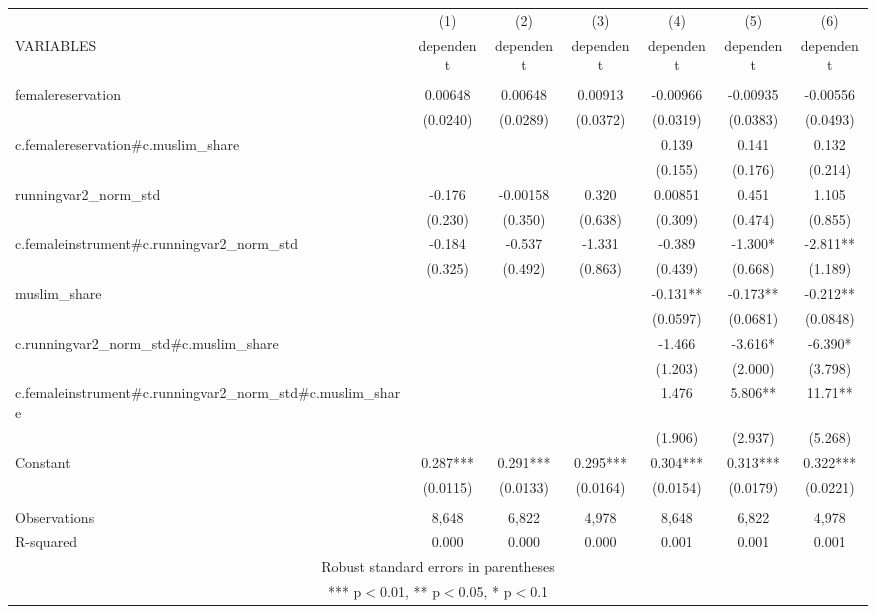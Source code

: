 \documentclass[]{article}
\begin{document}
\begin{tabular}{lcccccc} \hline
 & (1) & (2) & (3) & (4) & (5) & (6) \\
VARIABLES & dependent & dependent & dependent & dependent & dependent & dependent \\ \hline
 &  &  &  &  &  &  \\
femalereservation & 0.00648 & 0.00648 & 0.00913 & -0.00966 & -0.00935 & -0.00556 \\
 & (0.0240) & (0.0289) & (0.0372) & (0.0319) & (0.0383) & (0.0493) \\
c.femalereservation\#c.muslim\_share &  &  &  & 0.139 & 0.141 & 0.132 \\
 &  &  &  & (0.155) & (0.176) & (0.214) \\
runningvar2\_norm\_std & -0.176 & -0.00158 & 0.320 & 0.00851 & 0.451 & 1.105 \\
 & (0.230) & (0.350) & (0.638) & (0.309) & (0.474) & (0.855) \\
c.femaleinstrument\#c.runningvar2\_norm\_std & -0.184 & -0.537 & -1.331 & -0.389 & -1.300* & -2.811** \\
 & (0.325) & (0.492) & (0.863) & (0.439) & (0.668) & (1.189) \\
muslim\_share &  &  &  & -0.131** & -0.173** & -0.212** \\
 &  &  &  & (0.0597) & (0.0681) & (0.0848) \\
c.runningvar2\_norm\_std\#c.muslim\_share &  &  &  & -1.466 & -3.616* & -6.390* \\
 &  &  &  & (1.203) & (2.000) & (3.798) \\
c.femaleinstrument\#c.runningvar2\_norm\_std\#c.muslim\_share &  &  &  & 1.476 & 5.806** & 11.71** \\
 &  &  &  & (1.906) & (2.937) & (5.268) \\
Constant & 0.287*** & 0.291*** & 0.295*** & 0.304*** & 0.313*** & 0.322*** \\
 & (0.0115) & (0.0133) & (0.0164) & (0.0154) & (0.0179) & (0.0221) \\
 &  &  &  &  &  &  \\
Observations & 8,648 & 6,822 & 4,978 & 8,648 & 6,822 & 4,978 \\
 R-squared & 0.000 & 0.000 & 0.000 & 0.001 & 0.001 & 0.001 \\ \hline
\multicolumn{7}{c}{ Robust standard errors in parentheses} \\
\multicolumn{7}{c}{ *** p$<$0.01, ** p$<$0.05, * p$<$0.1} \\
\end{tabular}
\end{document}
